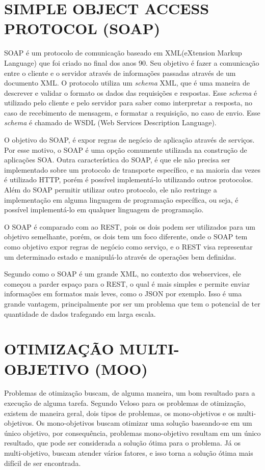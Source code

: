 

\section{SIMPLE OBJECT ACCESS PROTOCOL (SOAP)}
SOAP é um protocolo de comunicação baseado em XML(eXtension Markup Language) que foi criado no final 
dos anos 90. Seu objetivo é fazer a comunicação entre o cliente e o servidor através de informações 
passadas através de um documento XML. O protocolo utiliza um \textit{schema} XML, que é uma 
maneira de descrever e validar o formato os dados das requisições e respostas. 
Esse \textit{schema} é utilizado pelo cliente e pelo servidor para saber como interpretar 
a resposta, no caso de recebimento de mensagem, e formatar a requisição, no caso de envio.
Esse \textit{schema} é chamado de WSDL (Web Services Description Language).

O objetivo do SOAP, é expor regras de negócio de aplicação através de serviços. 
Por esse motivo, o SOAP é uma opção comumente utilizada na construção de aplicações SOA. 
Outra característica do SOAP, é que ele não precisa ser implementado sobre um protocolo de 
transporte específico, e na maioria das vezes é utilizado HTTP, porém é possível implementá-lo
utilizando outros protocolos. Além do SOAP permitir utilizar outro protocolo, 
ele não restringe a implementação em alguma linguagem de programação específica, ou seja,
é possível implementá-lo em qualquer linguagem de programação.

O SOAP é comparado com ao REST, pois os dois podem ser utilizados para um objetivo 
semelhante, porém, os dois tem um foco diferente, onde o SOAP tem como objetivo expor regras de negócio 
como serviço, e o REST visa representar um determinado estado e manipulá-lo através de operações 
bem definidas.

Segundo \cite{lecheta} como o SOAP é um grande XML, no contexto dos webservices, ele começou
a parder espaço para o REST, o qual é mais simples 
e permite enviar informações em formatos mais leves, como o JSON por exemplo. 
Isso é uma grande vantagem, principalmente por ser um problema
que tem o potencial de ter quantidade de dados trafegando em larga escala.

\section{OTIMIZAÇÃO MULTI-OBJETIVO (MOO)}  
Problemas de otimização buscam, de alguma maneira, um bom resultado para a execução de alguma tarefa.
Segundo Veloso \cite{veloso} para os problemas de otimização, existem de maneira geral, 
dois tipos de problemas, os mono-objetivos e os multi-objetivos. 
Os mono-objetivos buscam otimizar uma solução baseando-se em um único objetivo, por consequência, 
problemas mono-objetivo resultam em um único resultado, que pode ser considerada a solução ótima para o 
problema. Já os multi-objetivo, buscam atender vários fatores, e isso torna a solução ótima mais 
difícil de ser encontrada.


